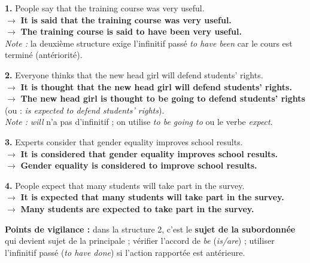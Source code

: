 \documentclass[11pt]{article}
\begin{document}
\begin{corrige}

\textbf{1.} People say that the training course was very useful.\\
$\rightarrow$ \textbf{It is said that the training course was very useful.}\\
$\rightarrow$ \textbf{The training course is said to have been very useful.}\\
\emph{Note :} la deuxième structure exige l'infinitif passé \emph{to have been} car le cours est terminé (antériorité).

\textbf{2.} Everyone thinks that the new head girl will defend students' rights.\\
$\rightarrow$ \textbf{It is thought that the new head girl will defend students' rights.}\\
$\rightarrow$ \textbf{The new head girl is thought to be going to defend students' rights} (ou : \emph{is expected to defend students' rights}).\\
\emph{Note :} \emph{will} n'a pas d'infinitif ; on utilise \emph{to be going to} ou le verbe \emph{expect}.

\textbf{3.} Experts consider that gender equality improves school results.\\
$\rightarrow$ \textbf{It is considered that gender equality improves school results.}\\
$\rightarrow$ \textbf{Gender equality is considered to improve school results.}

\textbf{4.} People expect that many students will take part in the survey.\\
$\rightarrow$ \textbf{It is expected that many students will take part in the survey.}\\
$\rightarrow$ \textbf{Many students are expected to take part in the survey.}

\textbf{Points de vigilance :} dans la structure 2, c'est le \textbf{sujet de la subordonnée} qui devient sujet de la principale ; vérifier l'accord de \emph{be} (\emph{is/are}) ; utiliser l'infinitif passé (\emph{to have done}) si l'action rapportée est antérieure.
\end{corrige}
\end{document}
